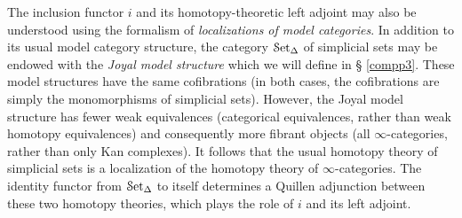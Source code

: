 \begin{1.2.5 inf-gpoids and classical homotopy}
\begin{remark}
The inclusion functor $i$ and its homotopy-theoretic left adjoint
may also be understood using the formalism of {\it
localizations of model categories}. In addition to its usual model
category structure, the category $\operatorname{\mathcal{S}et_{\Delta}}$ of simplicial sets may be
endowed with the {\it Joyal model structure} which we will define in \S
\ref{compp3}. These model structures have the same cofibrations (in both cases, the
cofibrations are simply the monomorphisms of simplicial sets).
However, the Joyal model structure has fewer weak equivalences
(categorical equivalences, rather than weak homotopy equivalences)
and consequently more fibrant objects (all $\infty$-categories,
rather than only Kan complexes). It follows that the usual
homotopy theory of simplicial sets is a
localization of the homotopy theory of $\infty$-categories. The
identity functor from $\operatorname{\mathcal{S}et_{\Delta}}$ to itself determines a Quillen
adjunction between these two homotopy theories, which plays the
role of $i$ and its left adjoint.
\end{remark}
\end{1.2.5 inf-gpoids and classical homotopy}
